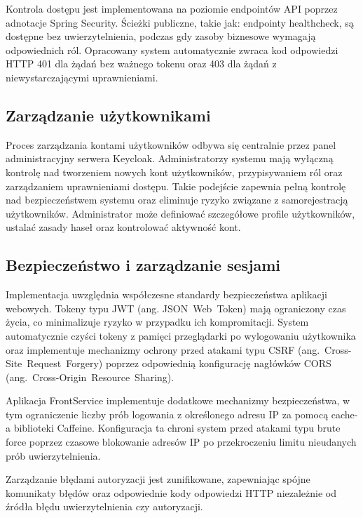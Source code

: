 Kontrola dostępu jest implementowana na poziomie endpointów API poprzez adnotacje Spring Security. Ścieżki publiczne, takie jak: endpointy healthcheck, są dostępne bez uwierzytelnienia, podczas gdy zasoby biznesowe wymagają odpowiednich ról. Opracowany system automatycznie zwraca kod odpowiedzi HTTP 401 dla żądań bez ważnego tokenu oraz 403 dla żądań z niewystarczającymi uprawnieniami.

\subsection{Zarządzanie użytkownikami}

Proces zarządzania kontami użytkowników odbywa się centralnie przez panel administracyjny serwera Keycloak. Administratorzy systemu mają wyłączną kontrolę nad tworzeniem nowych kont użytkowników, przypisywaniem ról oraz zarządzaniem uprawnieniami dostępu. Takie podejście zapewnia pełną kontrolę nad bezpieczeństwem systemu oraz eliminuje ryzyko związane z samorejestracją użytkowników. Administrator może definiować szczegółowe profile użytkowników, ustalać zasady haseł oraz kontrolować aktywność kont. 

\subsection{Bezpieczeństwo i zarządzanie sesjami}

Implementacja uwzględnia współczesne standardy bezpieczeństwa aplikacji webowych. Tokeny typu JWT (ang. \mbox{JSON Web Token}) mają ograniczony czas życia, co minimalizuje ryzyko w przypadku ich kompromitacji. System automatycznie czyści tokeny z pamięci przeglądarki po wylogowaniu użytkownika oraz implementuje mechanizmy ochrony przed atakami typu CSRF (ang.~\mbox{Cross-Site Request Forgery}) poprzez odpowiednią konfigurację nagłówków CORS \\ (ang.~\mbox{Cross-Origin Resource Sharing}).

Aplikacja FrontService implementuje dodatkowe mechanizmy bezpieczeństwa, w tym ograniczenie liczby prób logowania z określonego adresu IP za pomocą cache-a biblioteki Caffeine. Konfiguracja ta chroni system przed atakami typu brute force poprzez czasowe blokowanie adresów IP po przekroczeniu limitu nieudanych prób uwierzytelnienia.

Zarządzanie błędami autoryzacji jest zunifikowane, zapewniając spójne komunikaty błędów oraz odpowiednie kody odpowiedzi HTTP niezależnie od źródła błędu uwierzytelnienia czy autoryzacji.